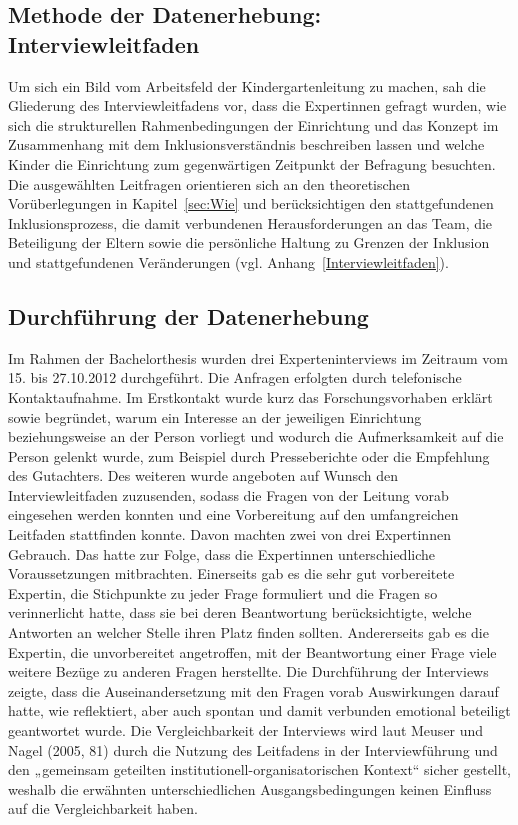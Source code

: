 \subsection{Methode der Datenerhebung: Interviewleitfaden}
Um sich ein Bild vom Arbeitsfeld der Kindergartenleitung zu machen, sah die Gliederung des Interviewleitfadens vor, dass die Expertinnen gefragt wurden, wie sich die strukturellen Rahmenbedingungen der Einrichtung und das Konzept im Zusammenhang mit dem Inklusionsverständnis beschreiben lassen und welche Kinder die Einrichtung zum gegenwärtigen Zeitpunkt der Befragung besuchten. Die ausgewählten Leitfragen orientieren sich an den theoretischen Vorüberlegungen in Kapitel~\ref{sec:Wie} und berücksichtigen den stattgefundenen Inklusionsprozess, die damit verbundenen Herausforderungen an das Team, die Beteiligung der Eltern sowie die persönliche Haltung zu Grenzen der Inklusion und stattgefundenen Veränderungen (vgl. Anhang~\ref{Interviewleitfaden}).

\subsection{Durchführung der Datenerhebung}
Im Rahmen der Bachelorthesis wurden drei Experteninterviews im Zeitraum vom 15. bis 27.10.2012 durchgeführt. 
Die Anfragen erfolgten durch telefonische Kontaktaufnahme. Im Erstkontakt wurde kurz das Forschungsvorhaben erklärt sowie begründet, warum ein Interesse an der jeweiligen Einrichtung beziehungsweise an der Person vorliegt und wodurch die Aufmerksamkeit auf die Person gelenkt wurde, zum Beispiel durch Presseberichte oder die Empfehlung des Gutachters. 
Des weiteren wurde angeboten auf Wunsch den Interviewleitfaden zuzusenden, sodass die Fragen von der Leitung vorab eingesehen werden konnten und eine Vorbereitung auf den umfangreichen Leitfaden stattfinden konnte. Davon machten zwei von drei Expertinnen Gebrauch. Das hatte zur Folge, dass die Expertinnen unterschiedliche Voraussetzungen mitbrachten. Einerseits gab es die sehr gut vorbereitete Expertin, die Stichpunkte zu jeder Frage formuliert und die Fragen so verinnerlicht hatte, dass sie bei deren Beantwortung berücksichtigte, welche Antworten an welcher Stelle ihren Platz finden sollten. Andererseits gab es die Expertin, die unvorbereitet angetroffen, mit der Beantwortung einer Frage viele weitere Bezüge zu anderen Fragen herstellte. Die Durchführung der Interviews zeigte, dass die Auseinandersetzung mit den Fragen vorab Auswirkungen darauf hatte, wie reflektiert, aber auch spontan und damit verbunden emotional beteiligt geantwortet wurde.     
Die Vergleichbarkeit der Interviews wird laut Meuser und Nagel (2005, 81) durch die Nutzung des Leitfadens in der Interviewführung und den „gemeinsam geteilten institutionell-organisatorischen Kontext“ sicher gestellt, weshalb die erwähnten unterschiedlichen Ausgangsbedingungen keinen Einfluss auf die Vergleichbarkeit haben.

